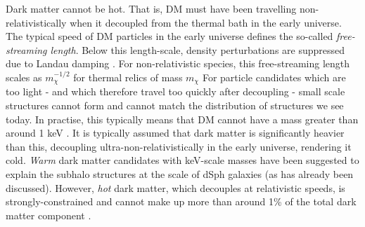 Dark matter cannot be hot. That is, DM must have been travelling non-relativistically when it decoupled from the thermal bath in the early universe. The typical speed of DM particles in the early universe defines the so-called \textit{free-streaming length}. Below this length-scale, density perturbations are suppressed due to Landau damping \cite{Bond:1983}. For non-relativistic species, this free-streaming length scales as $m_\chi^{-1/2}$ for thermal relics of mass $m_\chi$ \cite{Boyanovsky:2008} For particle candidates which are too light - and which therefore travel too quickly after decoupling - small scale structures cannot form and cannot match the distribution of structures we see today. In practise, this typically means that DM cannot have a mass greater than around 1 keV \cite{Narayanan:2000}. It is typically assumed that dark matter is significantly heavier than this, decoupling ultra-non-relativistically in the early universe, rendering it cold.  \textit{Warm} dark matter candidates with keV-scale masses have been suggested to explain the subhalo structures at the scale of dSph galaxies (as has already been discussed). However, \textit{hot} dark matter, which decouples at relativistic speeds, is strongly-constrained and cannot make up more than around 1\% of the total dark matter component \cite{Abazajian:2005, dePutter:2012}.


